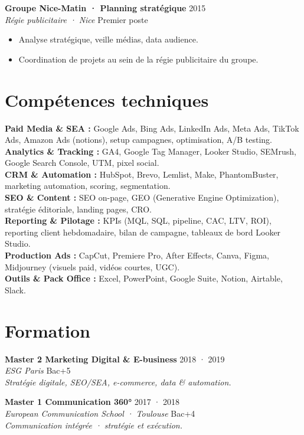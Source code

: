 \documentclass[a4paper,10pt]{article}
\newcommand{\expheader}[4]{%
  \textbf{\color{brown}#1} \hfill \color{greydark}\footnotesize #2 \\[-1pt]
  \textit{\color{greydark}\small #3} \hfill \color{greymid}\footnotesize #4 \\[2pt]
}
\begin{document}
\expheader{Groupe Nice-Matin · Planning stratégique}{2015}{Régie publicitaire · Nice}{Premier poste}
\begin{itemize}[leftmargin=12pt,itemsep=1pt,topsep=2pt]
  \item Analyse stratégique, veille médias, data audience.
  \item Coordination de projets au sein de la régie publicitaire du groupe.
\end{itemize}

\section{Compétences techniques}

\textbf{\color{brown}Paid Media \& SEA :} Google Ads, Bing Ads, LinkedIn Ads, Meta Ads, TikTok Ads, Amazon Ads (notions), setup campagnes, optimisation, A/B testing. \\[3pt]
\textbf{\color{brown}Analytics \& Tracking :} GA4, Google Tag Manager, Looker Studio, SEMrush, Google Search Console, UTM, pixel social. \\[3pt]
\textbf{\color{brown}CRM \& Automation :} HubSpot, Brevo, Lemlist, Make, PhantomBuster, marketing automation, scoring, segmentation. \\[3pt]
\textbf{\color{brown}SEO \& Content :} SEO on-page, GEO (Generative Engine Optimization), stratégie éditoriale, landing pages, CRO. \\[3pt]
\textbf{\color{brown}Reporting \& Pilotage :} KPIs (MQL, SQL, pipeline, CAC, LTV, ROI), reporting client hebdomadaire, bilan de campagne, tableaux de bord Looker Studio. \\[3pt]
\textbf{\color{brown}Production Ads :} CapCut, Premiere Pro, After Effects, Canva, Figma, Midjourney (visuels paid, vidéos courtes, UGC). \\[3pt]
\textbf{\color{brown}Outils \& Pack Office :} Excel, PowerPoint, Google Suite, Notion, Airtable, Slack.

\section{Formation}

\expheader{Master 2 Marketing Digital \& E-business}{2018 · 2019}{ESG Paris}{Bac+5}
\textit{Stratégie digitale, SEO/SEA, e-commerce, data \& automation.}

\vspace{4pt}
\expheader{Master 1 Communication 360°}{2017 · 2018}{European Communication School · Toulouse}{Bac+4}
\textit{Communication intégrée · stratégie et exécution.}
\end{document}
